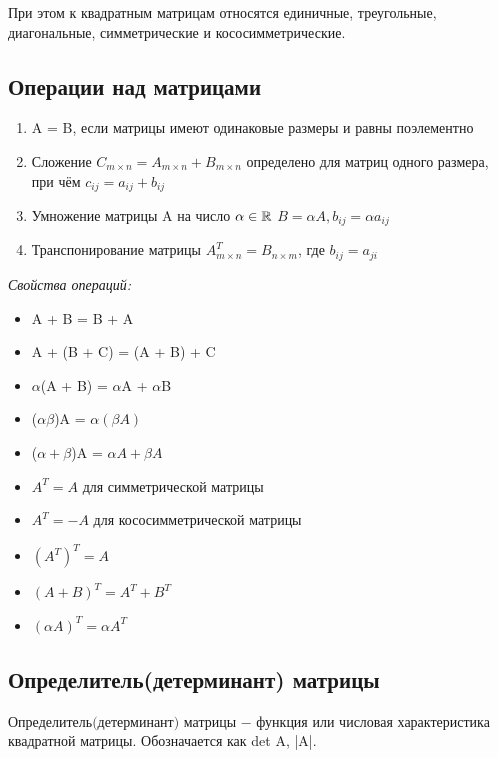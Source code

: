 При этом к квадратным матрицам относятся единичные, треугольные, диагональные, симметрические и кососимметрические.



\subsection{Операции над матрицами}

\begin{enumerate}
	\item A = B, если матрицы имеют одинаковые размеры и равны поэлементно
	\item Сложение $C_{m \times n} = A_{m \times n} + B_{m \times n}$ определено для матриц одного размера, при чём $c_{ij} = a_{ij} + b_{ij}$
	\item Умножение матрицы A на число $\alpha \in \mathbb{R}$ $B = \alpha A, b_{ij} = \alpha a_{ij}$
	\item Транспонирование матрицы $A_{m \times n}^T = B_{n \times m}$, где $b_{ij} = a_{ji}$
	
\end{enumerate}

\textit{Свойства операций:}
\begin{itemize}
	\item A + B = B + A
	\item A + (B + C) = (A + B) + C
	\item $\alpha$(A + B) = $\alpha$A + $\alpha$B
	\item ($\alpha\beta$)A = $\alpha(\beta A)$
	\item ($\alpha + \beta$)A = $\alpha A + \beta A$
	\item $A^T = A$ для симметрической матрицы
	\item $A^T = -A$ для кососимметрической матрицы
	\item $(A^T)^T = A$
	\item $(A + B)^T = A^T + B^T$
	\item $(\alpha A)^T = \alpha A^T$
\end{itemize}


\subsection{Определитель(детерминант) матрицы}

\begin{definition}
	$\textit{Определитель(детерминант) матрицы}$ $-$ функция или числовая характеристика квадратной матрицы. Обозначается как det A, |A|.
\end{definition}
	
